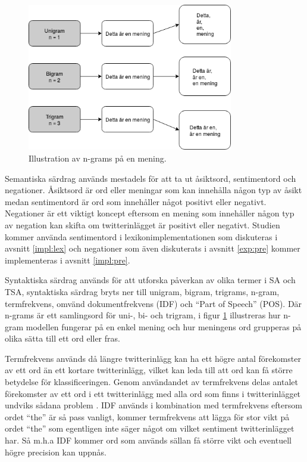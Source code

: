 \documentclass{kaumasters} %
\begin{document}
\begin{figure}[H]
\includegraphics[width=9cm]{grams}
\centering
\caption{Illustration av n-grams på en mening.}
\label{fig:grams}
\end{figure}

Semantiska särdrag används mestadels för att ta ut  åsiktsord, sentimentord och negationer. Åsiktsord är ord eller meningar som kan innehålla någon typ av åsikt medan sentimentord är ord som innehåller något positivt eller negativt. Negationer är ett viktigt koncept eftersom en mening som innehåller någon typ av negation kan skifta om twitterinlägget är positivt eller negativt. Studien kommer använda sentimentord i lexikonimplementationen som diskuteras i avsnitt \ref{impl:lex} och negationer som även diskuterats i avsnitt \ref{exp:pre} kommer implementeras i avsnitt \ref{impl:pre}.

Syntaktiska särdrag används för att utforska påverkan av olika termer i SA och TSA, syntaktiska särdrag bryts ner till unigram, bigram, trigrams, n-gram, termfrekvens, omvänd dokumentfrekvens (IDF) och “Part of Speech” (POS). Där n-grams är ett samlingsord för uni-, bi- och trigram, i figur \ref{fig:grams} illustreras hur n-gram modellen fungerar på en enkel mening och hur meningens ord grupperas på olika sätta till ett ord eller fras. 

Termfrekvens används då längre twitterinlägg kan ha ett högre antal förekomster av ett ord än ett kortare twitterinlägg, vilket kan leda till att ord kan få större betydelse för klassificeringen. Genom användandet av termfrekvens delas antalet förekomster av ett ord i ett twitterinlägg med alla ord som finns i twitterinlägget undviks sådana problem \cite{scikit:001}. IDF \cite{idf:001} används i kombination med termfrekvens eftersom ordet “the” är så pass vanligt, kommer termfrekvens att lägga för stor vikt på ordet “the” som egentligen inte säger något om vilket sentiment twitterinlägget har. Så m.h.a IDF kommer ord som används sällan få större vikt och eventuell högre precision kan uppnås.
\end{document}
